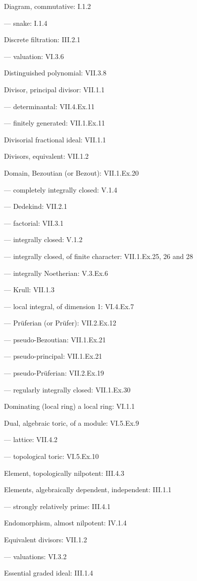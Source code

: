 Diagram, commutative: I.1.2

--- snake: I.1.4

Discrete filtration: III.2.1

--- valuation: VI.3.6

Distinguished polynomial: VII.3.8

Divisor, principal divisor: VII.1.1

--- determinantal: VII.4.Ex.11

--- finitely generated: VII.1.Ex.11

Divisorial fractional ideal: VII.1.1

Divisors, equivalent: VII.1.2

Domain, Bezoutian (or Bezout): VII.1.Ex.20

--- completely integrally closed: V.1.4

--- Dedekind: VII.2.1

--- factorial: VII.3.1

--- integrally closed: V.1.2

--- integrally closed, of finite character: VII.1.Ex.25, 26 and 28

--- integrally Noetherian: V.3.Ex.6

--- Krull: VII.1.3

--- local integral, of dimension 1: VI.4.Ex.7

--- Prüferian (or Prüfer): VII.2.Ex.12

--- pseudo-Bezoutian: VII.1.Ex.21

--- pseudo-principal: VII.1.Ex.21

--- pseudo-Prüferian: VII.2.Ex.19

--- regularly integrally closed: VII.1.Ex.30

Dominating (local ring) a local ring: VI.1.1

Dual, algebraic toric, of a module: VI.5.Ex.9

--- lattice: VII.4.2

--- topological toric: VI.5.Ex.10

Element, topologically nilpotent: III.4.3

Elements, algebraically dependent, independent: III.1.1

--- strongly relatively prime: III.4.1

Endomorphism, almost nilpotent: IV.1.4

Equivalent divisors: VII.1.2

--- valuations: VI.3.2

Essential graded ideal: III.1.4

